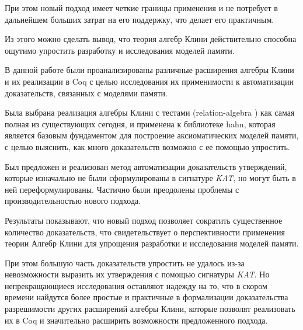 \documentclass[times
              ,specification
              ,annotation
              ]{itmo-student-thesis}
\begin{document}
    При этом новый подход имеет четкие границы применения и не потребует в дальнейшем больших затрат на
    его поддержку, что делает его практичным.

    Из этого можно сделать вывод, что теория алгебр Клини действительно способна ощутимо упростить
    разработку и исследования моделей памяти.
  
\startconclusionpage

  В данной работе были проанализированы различные расширения алгебры Клини и их реализации в Coq
  с целью исследования их применимости к автоматизации доказательств, связанных с моделями памяти.

  Была выбрана реализация алгебры Клини с тестами (relation-algebra \cite{kat}) как самая полная из
  существующих сегодня, и применена к
  библиотеке hahn, которая является базовым фундаментом для построение аксиоматических моделей памяти,
  с целью выяснить, как много доказательств возможно с ее помощью упростить.

  Был предложен и реализован метод автоматизации доказательств утверждений, которые изначально не
  были сформулированы в сигнатуре \textit{KAT}, но могут быть в ней переформулированы.
  Частично были преодолены проблемы с производительностью нового подхода.

  Результаты показывают, что новый подход позволяет сократить существенное количество доказательств,
  что свидетельствует о перспективности применения теории Алгебр Клини для упрощения разработки и
  исследования моделей памяти.

  При этом большую часть доказательств упростить не удалось из-за невозможности выразить их
  утверждения с помощью сигнатуры \textit{KAT}.
  Но непрекращающиеся исследования оставляют надежду на то, что в скором времени найдутся более простые и
  практичные в формализации доказательства разрешимости других расширений алгебры Клини, которые
  позволят реализовать их в Coq и значительно расширить возможности предложенного подхода.

\printmainbibliography

\appendix

\end{document}
